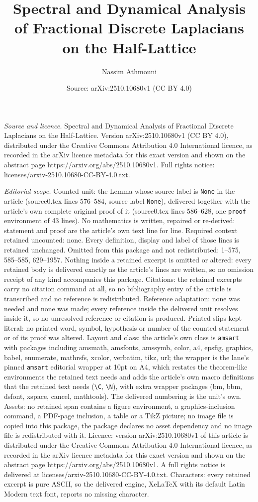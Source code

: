 \documentclass[10pt,a4paper]{amsart}
\title[Spectral and Dynamical Analysis of Fractional Discrete Lapla]{Spectral and Dynamical Analysis of Fractional Discrete Laplacians on the Half-Lattice}
\author{Nassim Athmouni}
\date{Source: arXiv:2510.10680v1 (CC BY 4.0)}
\begin{document}
\maketitle

\noindent\emph{Source and licence.} Spectral and Dynamical Analysis of Fractional Discrete Laplacians on the Half-Lattice. Version arXiv:2510.10680v1 (CC BY 4.0), distributed under the Creative Commons Attribution 4.0 International licence, as recorded in the arXiv licence metadata for this exact version and shown on the abstract page https://arxiv.org/abs/2510.10680v1. Full rights notice: licenses/arxiv-2510.10680-CC-BY-4.0.txt.\par\smallskip

\noindent\textit{Editorial scope.} Counted unit: the Lemma whose source label is \texttt{None} in the article (source0.tex lines 576--584, source label \texttt{None}), delivered together with the article's own complete original proof of it (source0.tex lines 586--628, one \texttt{proof} environment of 43 lines). No mathematics is written, repaired or re-derived: statement and proof are the article's own text line for line. Required context retained uncounted: none. Every definition, display and label of those lines is retained unchanged. Omitted from this package and not redistributed: 1--575, 585--585, 629--1957. Nothing inside a retained excerpt is omitted or altered: every retained body is delivered exactly as the article's lines are written, so no omission receipt of any kind accompanies this package. Citations: the retained excerpts carry no citation command at all, so no bibliography entry of the article is transcribed and no reference is redistributed. Reference adaptation: none was needed and none was made; every reference inside the delivered unit resolves inside it, so no unresolved reference or citation is produced. Printed slips kept literal: no printed word, symbol, hypothesis or number of the counted statement or of its proof was altered. Layout and class: the article's own class is \texttt{amsart} with packages including amsmath, amsfonts, amssymb, color, a4, epsfig, graphics, babel, enumerate, mathrsfs, xcolor, verbatim, tikz, url; the wrapper is the lane's pinned \texttt{amsart} editorial wrapper at 10pt on A4, which restates the theorem-like environments the retained text needs and adds the article's own macro definitions that the retained text needs (\texttt{\textbackslash C}, \texttt{\textbackslash N}), with extra wrapper packages (bm, bbm, dsfont, xspace, cancel, mathtools). The delivered numbering is the unit's own. Assets: no retained span contains a figure environment, a graphics-inclusion command, a PDF-page inclusion, a table or a TikZ picture; no image file is copied into this package, the package declares no asset dependency and no image file is redistributed with it. Licence: version arXiv:2510.10680v1 of this article is distributed under the Creative Commons Attribution 4.0 International licence, as recorded in the arXiv licence metadata for this exact version and shown on the abstract page https://arxiv.org/abs/2510.10680v1. A full rights notice is delivered at licenses/arxiv-2510.10680-CC-BY-4.0.txt. Characters: every retained excerpt is pure ASCII, so the delivered engine, XeLaTeX with its default Latin Modern text font, reports no missing character.
\end{document}
